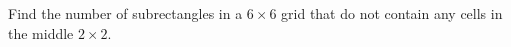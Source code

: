 Find the number of subrectangles in a $6\times 6$ grid that do not contain any cells in the middle $2\times 2$.
